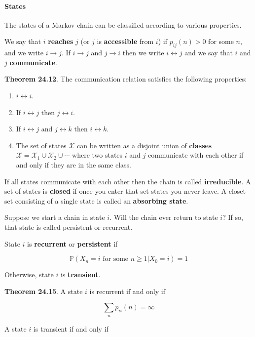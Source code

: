 \paragraph{States}\label{states}

The states of a Markov chain can be classified according to various
properties.

We say that \(i\) \textbf{reaches} \(j\) (or \(j\) is
\textbf{accessible} from \(i\)) if \(p_{ij}(n) > 0\) for some \(n\), and
we write \(i \rightarrow j\). If \(i \rightarrow j\) and
\(j \rightarrow i\) then we write \(i \leftrightarrow j\) and we say
that \(i\) and \(j\) \textbf{communicate}.

\textbf{Theorem 24.12}. The communication relation satisfies the
following properties:

\begin{enumerate}[tightlist,label={\arabic*.}]
\item
  \(i \leftrightarrow i\).
\item
  If \(i \leftrightarrow j\) then \(j \leftrightarrow i\).
\item
  If \(i \leftrightarrow j\) and \(j \leftrightarrow k\) then
  \(i \leftrightarrow k\).
\item
  The set of states \(\mathcal{X}\) can be written as a disjoint union
  of \textbf{classes}
  \(\mathcal{X} = \mathcal{X}_{1} \cup \mathcal{X}_{2} \cup \cdots\) where
  two states \(i\) and \(j\) communicate with each other if and only if
  they are in the same class.
\end{enumerate}

If all states communicate with each other then the chain is called
\textbf{irreducible}. A set of states is \textbf{closed} if once you
enter that set states you never leave. A closet set consisting of a
single state is called an \textbf{absorbing state}.

Suppose we start a chain in state \(i\). Will the chain ever return to
state \(i\)? If so, that state is called persistent or recurrent.

State \(i\) is \textbf{recurrent} or \textbf{persistent} if

\[ \mathbb{P}(X_{n} = i \text{ for some } n \geq 1 | X_{0} = i) = 1 \]

Otherwise, state \(i\) is \textbf{transient}.

\textbf{Theorem 24.15}. A state \(i\) is recurrent if and only if

\[ \sum_{n} p_{ii}(n) = \infty \]

A state \(i\) is transient if and only if

